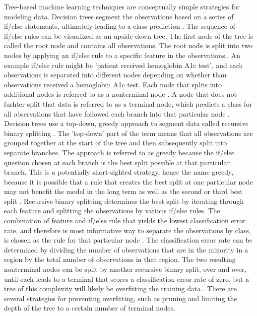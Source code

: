 \documentclass[sigconf]{acmart}
\begin{document}
Tree-based machine learning techniques are conceptually simple strategies for modeling data. Decision trees segment the observations based on a series of if/else statements, ultimately leading to a class prediction \cite{cite08}. The sequence of if/else rules can be visualized as an upside-down tree. The first node of the tree is called the root node and contains all observations. The root node is split into two nodes by applying an if/else rule to a specific feature in the observations.\cite{cite13}. An example if/else rule might be 'patient received hemoglobin A1c test', and each observations is separated into different nodes depending on whether than observations received a hemoglobin A1c test. Each node that splits into additional nodes is referred to as a nonterminal node \cite{cite13}. A node that does not furhter split that data is referred to as a terminal node, which predicts a class for all observations that have followed each branch into that particular node \cite{cite13}.
Decision trees use a top-down, greedy approach to segment data called recursive binary splitting \cite{03}. The 'top-down' part of the term means that all observations are grouped together at the start of the tree and then subsequently split into separate branches. The approach is referred to as greedy because the if/else question chosen at each branch is the best split possible at that particular branch. This is a potentially short-sighted strategy, hence the name greedy, because it is possible that a rule that creates the best split at one particular node may not benefit the model in the long term as well as the second or third best split \cite{cite03}.
Recursive binary splitting determines the best split by iterating through each feature and splitting the observations by various if/else rules. The combination of feature and if/else rule that yields the lowest classification error rate, and therefore is most informative way to separate the observations by class, is chosen as the rule for that particular node \cite{cite03} \cite{cite08}. The classification error rate can be determined by dividing the number of observations that are in the minority in a region by the total number of observations in that region.
The two resulting nonterminal nodes can be split by another recursive binary split, over and over, until each leads to a terminal that scores a classification error rate of zero, but a tree of this complexity will likely be overfitting the training data \cite{cite03}. There are several strategies for preventing overfitting, such as pruning and limiting the depth of the tree to a certain number of terminal nodes. 
\end{document}
